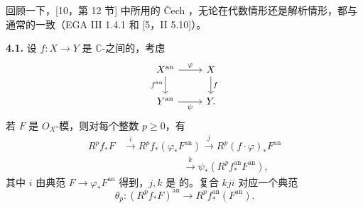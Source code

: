 回顾一下，[10，第 12 节] 中所用的 Čech ，无论在代数情形还是解析情形，都与通常的一致（EGA III 1.4.1 和 [5，II 5.10]）。

\textbf{4.1.} 设 $f:X\to Y$ 是 $\mathbb C$-之间的，考虑
\[
\begin{tikzcd}
X^{\mathrm{an}}\arrow[r,"\varphi"]\arrow[d,"f^{\mathrm{an}}"']&X\arrow[d,"f"]\\
Y^{\mathrm{an}}\arrow[r,"\psi"']&Y.
\end{tikzcd}
\]
若 $F$ 是 $O_X$-模，则对每个整数 $p\geq0$，有
\[
\begin{aligned}
R^pf_*F&\xrightarrow{i}R^pf_*(\varphi_*F^{\mathrm{an}})
\xrightarrow{j}R^p(f\cdot\varphi)_*F^{\mathrm{an}}\\
&\hspace{6em}\xrightarrow{k}\psi_*(R^pf_*^{\mathrm{an}}F^{\mathrm{an}}),
\end{aligned}
\]
其中 $i$ 由典范 $F\to\varphi_*F^{\mathrm{an}}$ 得到，$j,k$ 是 的。复合 $kji$ 对应一个典范
\[
\theta_p:(R^pf_*F)^{\mathrm{an}}\longrightarrow R^pf_*^{\mathrm{an}}(F^{\mathrm{an}}).
\tag{4.1.1}
\]

